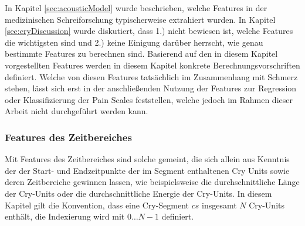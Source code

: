 In Kapitel \ref{sec:acousticModel} wurde beschrieben, welche Features in der medizinischen Schreiforschung typischerweise extrahiert wurden. In Kapitel \ref{sec:cryDiscussion} wurde diskutiert, dass 1.) nicht bewiesen ist, welche Features die \glqq wichtigsten\grqq{} sind und 2.) keine Einigung darüber herrscht, wie genau bestimmte Features zu berechnen sind. Basierend auf den in diesem Kapitel vorgestellten Features werden in diesem Kapitel konkrete Berechnungsvorschriften definiert. Welche von diesen Features tatsächlich im Zusammenhang mit Schmerz stehen, lässt sich erst in der anschließenden Nutzung der Features zur Regression oder Klassifizierung der Pain Scales feststellen, welche jedoch im Rahmen dieser Arbeit nicht durchgeführt werden kann.

\subsubsection{Features des Zeitbereiches}

Mit Features des Zeitbereiches sind solche gemeint, die sich allein aus Kenntnis der der Start- und Endzeitpunkte der im Segment enthaltenen Cry Units sowie deren Zeitbereiche gewinnen lassen, wie beispielsweise die durchschnittliche Länge der Cry-Units oder die durchschnittliche Energie der Cry-Units. In diesem Kapitel gilt die Konvention, dass eine Cry-Segment $cs$ insgesamt $N$ Cry-Units enthält, die Indexierung wird mit $0 \ldots N-1$ definiert.

